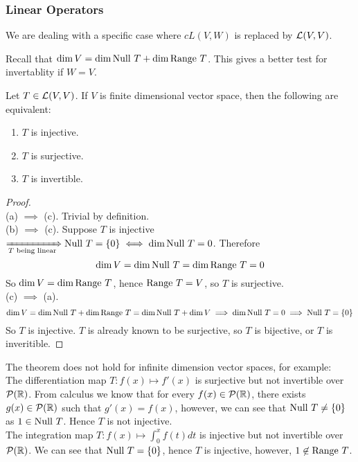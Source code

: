 \subsubsection{Linear Operators}
We are dealing with a specific case where $c  L(V,W)$ is replaced by $\mathcal L(V,V)$.
\begin{center}
\end{center}
Recall that $\dim V = \dim \text{Null } T + \dim \text{Range } T$. This gives a better test for invertablity if $W  = V$. 
\begin{theorem}
    Let $T \in \mathcal L(V,V)$. If $V$ is finite dimensional vector space, then the following are equivalent: 
    \begin{enumerate}[label = (\alph*)]
        \item $T$ is injective.
        \item $T$ is surjective.
        \item $T$ is invertible.
    \end{enumerate}
\end{theorem}
\begin{proof} $ $ \\
    (a) $\implies$ (c). Trivial by definition. \\
    (b) $\implies$ (c). Suppose $T$ is injective $\xRightarrow[T \text{ being linear}]{} \text{Null } T = \left\{ 0 \right\} \iff \dim \text{Null } T = 0$. Therefore 
    \[ \dim V = \dim \text{Null } T = \dim \text{Range } T = 0\] So $\dim V = \dim \text{Range } T$, hence $\text{Range } T = V$, so $T$ is surjective. \\
    (c) $\implies$ (a).  \[\dim V = \dim \text{Null } T + \dim \text{Range } T = \dim \text{Null } T + \dim V \implies \dim \text{Null } T  = 0 \implies \text{Null } T = \left\{0\right\}\] So $T$ is injective. $T$ is already known to be surjective, so $T$ is bijective, or $T$ is inveritible.
\end{proof}
\begin{example}
    The theorem does not hold for infinite dimension vector spaces, for example: \\ 
    The differentiation map $T : f(x) \mapsto f'(x)$ is surjective but not invertible over $\mathcal P(\mathbb R)$.  From calculus we know that for every $f(x) \in \mathcal P(\mathbb R)$, there exists $g(x) \in \mathcal P(\mathbb R)$ such that $g'(x) = f(x)$, however, we can see that $\text{Null } T \neq \left\{ 0 \right\}$ as $1 \in
    \text{Null } T$. Hence $T$ is not injective. \\
    The integration map $\displaystyle T: f(x) \mapsto \int_0^x f(t) dt$ is injective but not invertible over $\mathcal P(\mathbb R)$. We can see that $\text{Null } T = \left\{ 0 \right\}$, hence $T$ is injective, however, $1 \not\in \text{Range } T$.
\end{example}
